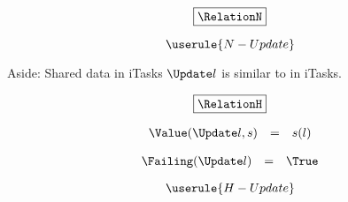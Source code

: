 \begin{equation*}
  \boxed{\RelationN}
\end{equation*}

\begin{equation*}
  \userule{N-Update}
\end{equation*}

\begin{margintext}{Aside: Shared data in iTasks}
  $\Update l$ is similar to  in iTasks.
\end{margintext}

\begin{equation*}
  \boxed{\RelationH}
\end{equation*}

\begin{equation*}
  \begin{array}{lcl}
    \Value(\Update l, s) &=& s(l)
  \end{array}
\end{equation*}

\begin{equation*}
  \begin{array}{lcl}
    \Failing(\Update l) &=& \True
  \end{array}
\end{equation*}

\begin{equation*}
  \userule{H-Update}
\end{equation*}
